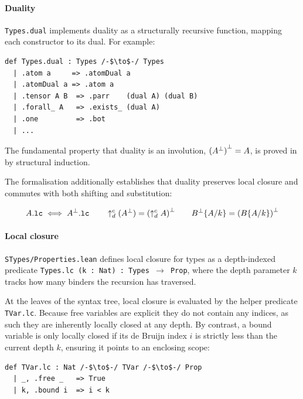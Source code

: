 \paragraph{Duality} \texttt{Types.dual} implements duality as a structurally recursive function, mapping each constructor to its dual. For example:

\begin{lstlisting}[language=Lean4]
def Types.dual : Types /-$\to$-/ Types
  | .atom a     => .atomDual a
  | .atomDual a => .atom a
  | .tensor A B  => .parr    (dual A) (dual B)
  | .forall_ A   => .exists_ (dual A)
  | .one         => .bot
  | ...
\end{lstlisting}

The fundamental property that duality is an involution, {${(A^\bot)}^\bot = A$}, is proved in  by structural induction.

The formalisation additionally establishes that duality preserves local closure and commutes with both shifting and substitution:
\begin{highlight}  
\begin{gather*}
A.\texttt{lc} \iff A^\bot.\texttt{lc} \qquad
\uparrow_{d}^{c}(A^\bot) = {(\uparrow_{d}^{c}A)}^\bot \qquad
B^\bot\{A/k\} = {(B\{A/k\})}^\bot
\end{gather*}
\end{highlight}

\paragraph{Local closure} \texttt{STypes\slash{}Properties.lean} defines local closure for types as a depth-indexed predicate \texttt{Types.lc (k~: Nat)~: Types $\to$ Prop}, where the depth parameter $k$ tracks how many binders the recursion has traversed. 

At the leaves of the syntax tree, local closure is evaluated by the helper predicate \texttt{TVar.lc}. Because free variables are explicit they do not contain any indices, as such they are inherently locally closed at any depth. By contrast, a bound variable is only locally closed if its de Bruijn index $i$ is strictly less than the current depth $k$, ensuring it points to an enclosing scope:

\begin{lstlisting}[language=Lean4]
def TVar.lc : Nat /-$\to$-/ TVar /-$\to$-/ Prop
  | _, .free _   => True
  | k, .bound i  => i < k
\end{lstlisting}

